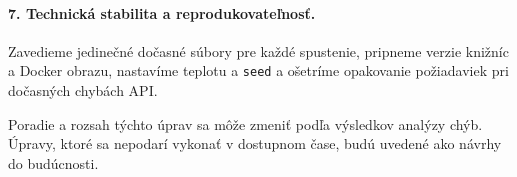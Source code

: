 \paragraph{7. Technická stabilita a reprodukovateľnosť.} Zavedieme jedinečné dočasné súbory pre každé spustenie, pripneme verzie knižníc a Docker obrazu, nastavíme teplotu a \texttt{seed} a ošetríme opakovanie požiadaviek pri dočasných chybách API.

Poradie a rozsah týchto úprav sa môže zmeniť podľa výsledkov analýzy chýb. Úpravy, ktoré sa nepodarí vykonať v dostupnom čase, budú uvedené ako návrhy do budúcnosti.